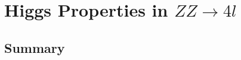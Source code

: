 \chapter{Higgs Properties in $ZZ\rightarrow4l$}
\label{sec:properties}

\section{Summary}
\label{sec:properties_summary}